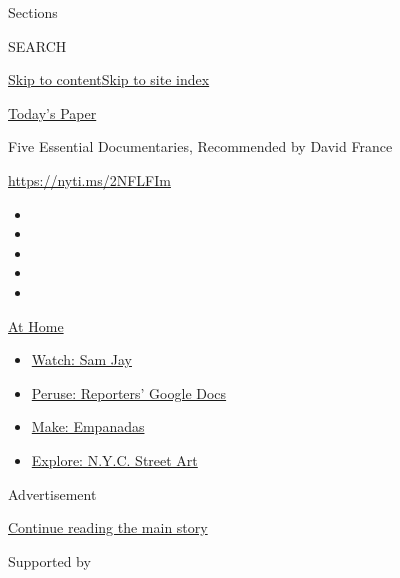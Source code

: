 Sections

SEARCH

\protect\hyperlink{site-content}{Skip to
content}\protect\hyperlink{site-index}{Skip to site index}

\href{https://myaccount.nytimes.com/auth/login?response_type=cookie\&client_id=vi}{}

\href{https://www.nytimes.com/section/todayspaper}{Today's Paper}

Five Essential Documentaries, Recommended by David France

\href{https://nyti.ms/2NFLFIm}{https://nyti.ms/2NFLFIm}

\begin{itemize}
\item
\item
\item
\item
\item
\end{itemize}

\href{https://www.nytimes.com/spotlight/at-home?action=click\&pgtype=Article\&state=default\&region=TOP_BANNER\&context=at_home_menu}{At
Home}

\begin{itemize}
\tightlist
\item
  \href{https://www.nytimes.com/2020/08/04/arts/television/sam-jay-netflix-special.html?action=click\&pgtype=Article\&state=default\&region=TOP_BANNER\&context=at_home_menu}{Watch:
  Sam Jay}
\item
  \href{https://www.nytimes.com/interactive/2020/at-home/even-more-reporters-editors-diaries-lists-recommendations.html?action=click\&pgtype=Article\&state=default\&region=TOP_BANNER\&context=at_home_menu}{Peruse:
  Reporters' Google Docs}
\item
  \href{https://www.nytimes.com/2020/08/04/dining/colombian-empanadas-carlos-gaviria.html?action=click\&pgtype=Article\&state=default\&region=TOP_BANNER\&context=at_home_menu}{Make:
  Empanadas}
\item
  \href{https://www.nytimes.com/2020/08/06/arts/design/street-art-nyc-george-floyd.html?action=click\&pgtype=Article\&state=default\&region=TOP_BANNER\&context=at_home_menu}{Explore:
  N.Y.C. Street Art}
\end{itemize}

Advertisement

\protect\hyperlink{after-top}{Continue reading the main story}

Supported by

